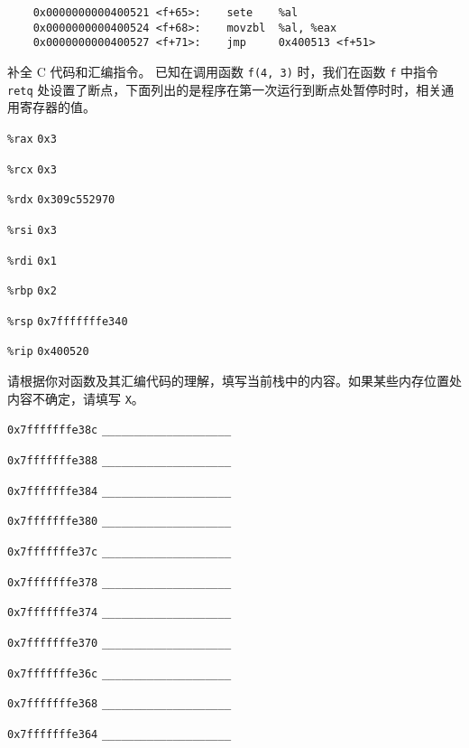 \begin{problems}
\begin{verbatim}
    0x0000000000400521 <f+65>:    sete    %al
    0x0000000000400524 <f+68>:    movzbl  %al, %eax
    0x0000000000400527 <f+71>:    jmp     0x400513 <f+51>
        \end{verbatim}
        \qn 补全 C 代码和汇编指令。
        \qn 已知在调用函数 \verb|f(4, 3)| 时，我们在函数 \verb|f| 中指令 \verb|retq| 处设置了断点，下面列出的是程序在第一次运行到断点处暂停时时，相关通用寄存器的值。
        \begin{compactdesc}
            \item[\texttt{\%rax}] \verb|0x3|
            \item[\texttt{\%rcx}] \verb|0x3|
            \item[\texttt{\%rdx}] \verb|0x309c552970|
            \item[\texttt{\%rsi}] \verb|0x3|
            \item[\texttt{\%rdi}] \verb|0x1|
            \item[\texttt{\%rbp}] \verb|0x2|
            \item[\texttt{\%rsp}] \verb|0x7fffffffe340|
            \item[\texttt{\%rip}] \verb|0x400520|
        \end{compactdesc}
        请根据你对函数及其汇编代码的理解，填写当前栈中的内容。如果某些内存位置处内容不确定，请填写 \verb|X|。
        \begin{compactdesc}
            \item[\texttt{0x7fffffffe38c}] \verb|____________________|
            \item[\texttt{0x7fffffffe388}] \verb|____________________|
            \item[\texttt{0x7fffffffe384}] \verb|____________________|
            \item[\texttt{0x7fffffffe380}] \verb|____________________|
            \item[\texttt{0x7fffffffe37c}] \verb|____________________|
            \item[\texttt{0x7fffffffe378}] \verb|____________________|
            \item[\texttt{0x7fffffffe374}] \verb|____________________|
            \item[\texttt{0x7fffffffe370}] \verb|____________________|
            \item[\texttt{0x7fffffffe36c}] \verb|____________________|
            \item[\texttt{0x7fffffffe368}] \verb|____________________|
            \item[\texttt{0x7fffffffe364}] \verb|____________________|

\end{compactdesc}
\end{problems}
